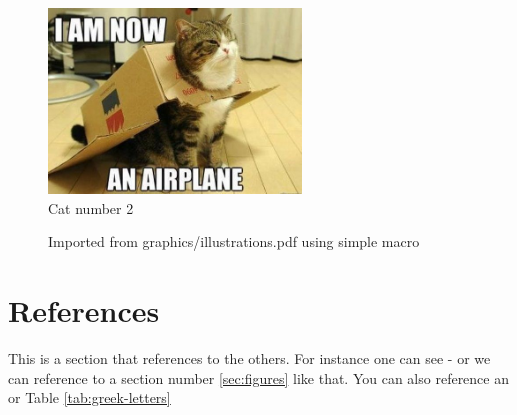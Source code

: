 \documentclass{article}
\begin{document}
\begin{figure}
  \centering
  \includegraphics[width=0.6\textwidth]{graphics/cat2}
  \caption{Cat number 2}
  \label{fig:cat2}
\end{figure}

\begin{figure}[h!]
  \centering
  \caption{Imported from graphics/illustrations.pdf using
    simple macro}
  \label{fig:import}
\end{figure}

\FloatBarrier

\section{References}
\label{sec:references}

This is a section that references to the others. For instance one can
see  - or we can reference to a section number
\ref{sec:figures} like that. You can also reference an 
or Table \ref{tab:greek-letters}


\end{document}
